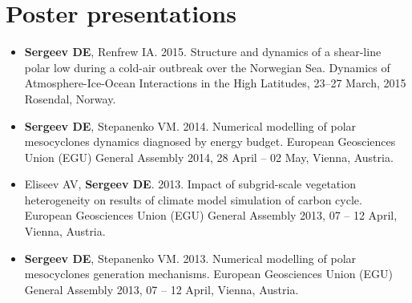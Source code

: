\documentclass[a4paper,10pt]{article}
\begin{document}
\section{Poster presentations}
\begin{itemize} \renewcommand{\labelitemi}{\scriptsize$\blacksquare$}
    \item {\bf Sergeev DE}, Renfrew IA. 2015. Structure and dynamics of a shear-line polar low during a cold-air outbreak over the Norwegian Sea. Dynamics of Atmosphere-Ice-Ocean Interactions in the High Latitudes, 23--27 March, 2015 Rosendal, Norway.
	\item {\bf Sergeev DE}, Stepanenko VM. 2014. Numerical modelling of polar mesocyclones dynamics diagnosed by energy budget. European Geosciences Union (EGU) General Assembly 2014, 28 April -- 02 May, Vienna, Austria.
	\item Eliseev AV, {\bf Sergeev DE}. 2013. Impact of subgrid-scale vegetation heterogeneity on results of climate model simulation of carbon cycle. European Geosciences Union (EGU) General Assembly 2013, 07 -- 12 April, Vienna, Austria.
	\item {\bf Sergeev DE}, Stepanenko VM. 2013. Numerical modelling of polar mesocyclones generation mechanisms. European Geosciences Union (EGU) General Assembly 2013, 07 -- 12 April, Vienna, Austria.
\end{itemize}
\end{document}
